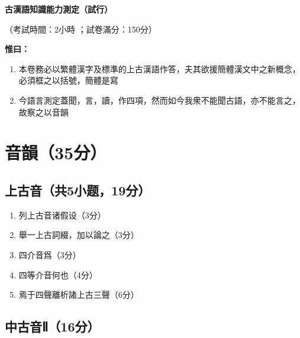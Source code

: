 \documentclass[12pt,a4paper]{article}
\begin{document}
\begin{center}
    \LARGE\textbf{古漢語知識能力測定（試行）}
    
    \vspace{1em}
    
    \large（考試時間：2小時 ；試卷滿分：150分）
\end{center}

\vspace{2em}

\noindent\textbf{惟曰：}
\begin{enumerate}[leftmargin=*, itemsep=0.5ex]
    \item 本卷務必以繁體漢字及標準的上古漢語作答，夫其欲援簡體漢文中之新概念，必須框之以括號，簡體是寫
    \item 今語言測定蓋聞，言，讀，作四項，然而如今我衆不能聞古語，亦不能言之，故察之以音韻
\end{enumerate}

\vspace{2em}

\section{音韻（35分）}

\subsection{上古音（共5小题，19分）}

\vspace{1em}

\begin{enumerate}[leftmargin=*, label=\textbf{\arabic*.}]
    \item 列上古音诸假设（3分）
    

    \item 舉一上古詞綴，加以論之（3分）
    
   
    \item 四介音爲（3分）
 
    
    \item 四等介音何也（4分）
    
    \vspace{8em}
    
    \item 焉于四聲離析諸上古三聲（6分）
    
    \vspace{10em}
\end{enumerate}

\subsection{中古音Ⅱ（16分）}
\end{document}
